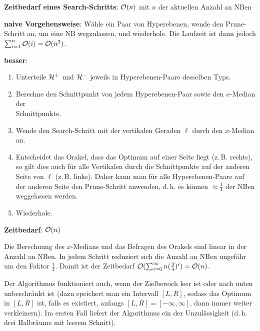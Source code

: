 \textbf{Zeitbedarf eines Search-Schritts}:
$\mathcal{O}(n)$ mit $n$ der aktuellen Anzahl an NBen

\linie

\textbf{naive Vorgehensweise}:
Wähle ein Paar von Hyperebenen, wende den Prune-Schritt an, um eine NB wegzulassen, und wiederhole.
Die Laufzeit ist dann jedoch $\sum_{i=1}^n \mathcal{O}(i) = \mathcal{O}(n^2)$.

\textbf{besser}:
\begin{enumerate}
    \item
    Unterteile $\mathcal{H}^+$ und $\mathcal{H}^-$ jeweils in Hyperebenen-Paare desselben Typs.

    \item
    Berechne den Schnittpunkt von jedem Hyperebenen-Paar sowie den $x$-Median der\\
    Schnittpunkte.

    \item
    Wende den Search-Schritt mit der vertikalen Geraden $\ell$ durch den $x$-Median an.

    \item
    Entscheidet das Orakel, dass das Optimum auf einer Seite liegt (z.\,B. rechts),
    so gilt dies auch für alle Vertikalen durch die Schnittpunkte auf der anderen Seite von $\ell$
    (z.\,B. links).
    Daher kann man für alle Hyperebenen-Paare auf der anderen Seite den Prune-Schritt anwenden,
    d.\,h. es können $\approx \frac{1}{4}$ der NBen weggelassen werden.

    \item
    Wiederhole.
\end{enumerate}

\textbf{Zeitbedarf}:
$\mathcal{O}(n)$

\begin{Beweis}
    Die Berechnung des $x$-Medians und das Befragen des Orakels sind linear in der Anzahl an NBen.
    In jedem Schritt reduziert sich die Anzahl an NBen ungefähr um den Faktor $\frac{1}{4}$.
    Damit ist der Zeitbedarf $\mathcal{O}(\sum_{i=0}^\infty n (\frac{3}{4})^i) = \mathcal{O}(n)$.
\end{Beweis}

\linie

Der Algorithmus funktioniert auch, wenn der Zielbereich leer ist oder nach unten
unbeschränkt ist (dazu speichert man ein Intervall $[L, R]$, sodass das Optimum in $[L, R]$ ist,
falls es existiert, anfangs $[L, R] = [-\infty, \infty]$, dann immer weiter verkleinern).
Im ersten Fall liefert der Algorithmus ein  der Unzulässigkeit
(d.\,h. drei Halbräume mit leerem Schnitt).

